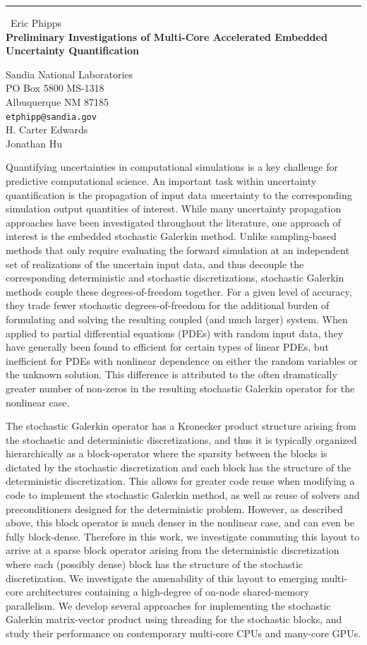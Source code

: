 \documentclass{report}
\begin{document}
\begin{center}
\rule{6in}{1pt} \
{\large Eric Phipps \\
{\bf Preliminary Investigations of Multi-Core Accelerated Embedded Uncertainty Quantification}}

Sandia National Laboratories \\ PO Box 5800 MS-1318 \\ Albuquerque NM 87185
\\
{\tt etphipp@sandia.gov}\\
H. Carter Edwards\\
Jonathan Hu\end{center}

Quantifying uncertainties in computational simulations is a key challenge
for predictive computational science. An important task within
uncertainty quantification is the propagation of input data uncertainty
to the corresponding simulation output quantities of interest. While many
uncertainty propagation approaches have been investigated throughout the
literature, one approach of interest is the embedded stochastic Galerkin
method. Unlike sampling-based methods that only require evaluating the
forward simulation at an independent set of realizations of the uncertain
input data, and thus decouple the corresponding deterministic and
stochastic discretizations, stochastic Galerkin methods couple these
degrees-of-freedom together. For a given level of accuracy, they trade
fewer stochastic degrees-of-freedom for the additional burden of
formulating and solving the resulting coupled (and much larger) system.
When applied to partial differential equations (PDEs) with random input
data, they have generally been found to efficient for certain types of
linear PDEs, but inefficient for PDEs with nonlinear dependence on either
the random variables or the unknown solution. This difference is
attributed to the often dramatically greater number of non-zeros in the
resulting stochastic Galerkin operator for the nonlinear case.

The stochastic Galerkin operator has a Kronecker product structure
arising from the stochastic and deterministic discretizations, and thus
it is typically organized hierarchically as a block-operator where the
sparsity between the blocks is dictated by the stochastic discretization
and each block has the structure of the deterministic discretization.
This allows for greater code reuse when modifying a code to implement the
stochastic Galerkin method, as well as reuse of solvers and
preconditioners designed for the deterministic problem. However, as
described above, this block operator is much denser in the nonlinear
case, and can even be fully block-dense. Therefore in this work, we
investigate commuting this layout to arrive at a sparse block operator
arising from the deterministic discretization where each (possibly dense)
block has the structure of the stochastic discretization. We investigate
the amenability of this layout to emerging multi-core architectures
containing a high-degree of on-node shared-memory parallelism. We develop
several approaches for implementing the stochastic Galerkin matrix-vector
product using threading for the stochastic blocks, and study their
performance on contemporary multi-core CPUs and many-core GPUs.
\end{document}
